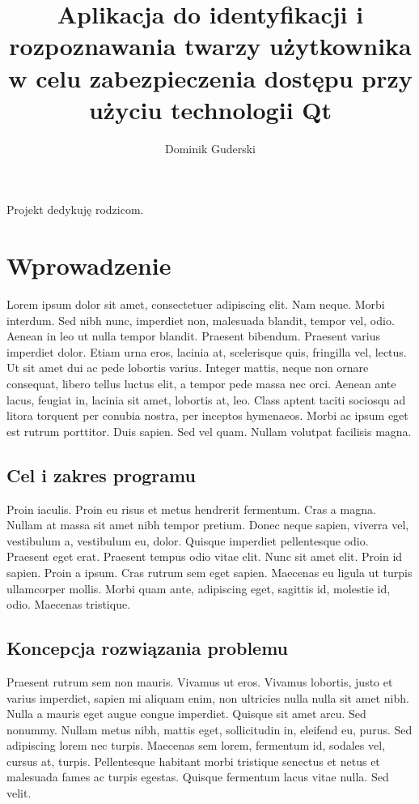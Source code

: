 \documentclass[eng,printmode]{mgr}
\title{Aplikacja do identyfikacji i rozpoznawania twarzy użytkownika w celu zabezpieczenia dostępu przy użyciu technologii Qt}
\author{Dominik Guderski}
\begin{document}

\maketitle %
\dedication{6cm}{Projekt dedykuję rodzicom.}

\tableofcontents %

\chapter{Wprowadzenie}
Lorem ipsum dolor sit amet, consectetuer adipiscing elit. Nam neque. Morbi interdum. Sed nibh nunc, imperdiet non, malesuada blandit, tempor vel, odio. Aenean in leo ut nulla tempor blandit. Praesent bibendum. Praesent varius imperdiet dolor. Etiam urna eros, lacinia at, scelerisque quis, fringilla vel, lectus. Ut sit amet dui ac pede lobortis varius. Integer mattis, neque non ornare consequat, libero tellus luctus elit, a tempor pede massa nec orci. Aenean ante lacus, feugiat in, lacinia sit amet, lobortis at, leo. Class aptent taciti sociosqu ad litora torquent per conubia nostra, per inceptos hymenaeos. Morbi ac ipsum eget est rutrum porttitor. Duis sapien. Sed vel quam. Nullam volutpat facilisis magna.

\section{Cel i zakres programu}
Proin iaculis. Proin eu risus et metus hendrerit fermentum. Cras a magna. Nullam at massa sit amet nibh tempor pretium. Donec neque sapien, viverra vel, vestibulum a, vestibulum eu, dolor. Quisque imperdiet pellentesque odio. Praesent eget erat. Praesent tempus odio vitae elit. Nunc sit amet elit. Proin id sapien. Proin a ipsum. Cras rutrum sem eget sapien. Maecenas eu ligula ut turpis ullamcorper mollis. Morbi quam ante, adipiscing eget, sagittis id, molestie id, odio. Maecenas tristique.

\section{Koncepcja rozwiązania problemu}
Praesent rutrum sem non mauris. Vivamus ut eros. Vivamus lobortis, justo et varius imperdiet, sapien mi aliquam enim, non ultricies nulla nulla sit amet nibh. Nulla a mauris eget augue congue imperdiet. Quisque sit amet arcu. Sed nonummy. Nullam metus nibh, mattis eget, sollicitudin in, eleifend eu, purus. Sed adipiscing lorem nec turpis. Maecenas sem lorem, fermentum id, sodales vel, cursus at, turpis. Pellentesque habitant morbi tristique senectus et netus et malesuada fames ac turpis egestas. Quisque fermentum lacus vitae nulla. Sed velit.
\end{document}
